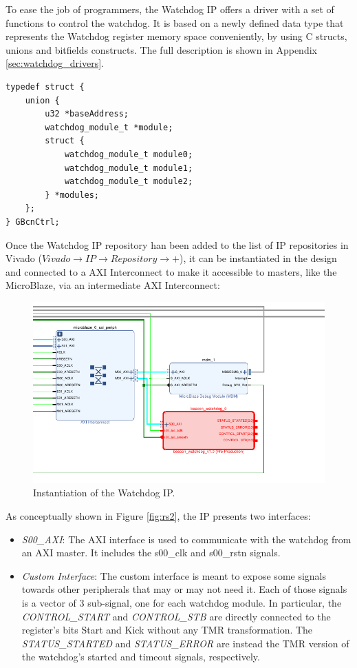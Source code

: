 To ease the job of programmers, the Watchdog IP offers a driver with a set of functions to control the watchdog. It is based on a newly defined data type that represents the Watchdog register memory space conveniently, by using C structs, unions and bitfields constructs. The full description is shown in Appendix \ref{sec:watchdog_drivers}.

\begin{lstlisting}[style=C]
typedef struct {
	union {
		u32 *baseAddress;
		watchdog_module_t *module;
		struct {
			watchdog_module_t module0;
			watchdog_module_t module1;
			watchdog_module_t module2;
		} *modules;
	};
} GBcnCtrl;
\end{lstlisting}

Once the Watchdog IP repository han been added to the list of IP repositories in Vivado ($Vivado \rightarrow IP \rightarrow Repository \rightarrow +$), it can be instantiated in the design and connected to a AXI Interconnect to make it accessible to masters, like the MicroBlaze, via an intermediate AXI Interconnect:

\begin{figure}[H]
\centering
\includegraphics[width=0.9\linewidth]{images/chapter4/wd_ip_inst_cropped2.pdf}
\caption{Instantiation of the Watchdog IP.}
\label{fig:wd_ip_inst}
\end{figure}

As conceptually shown in Figure \ref{fig:rs2}, the IP presents two interfaces:
\begin{itemize}
    \item \textit{S00\_AXI}: The AXI interface is used to communicate with the watchdog from an AXI master. It includes the s00\_clk and s00\_rstn signals.
    \item \textit{Custom Interface}: The custom interface is meant to expose some signals towards other peripherals that may or may not need it. Each of those signals is a vector of 3 sub-signal, one for each watchdog module. In particular, the \textit{CONTROL\_START} and \textit{CONTROL\_STB} are directly connected to the register's bits Start and Kick without any TMR transformation. The \textit{STATUS\_STARTED} and \textit{STATUS\_ERROR} are instead the TMR version of the watchdog's started and timeout signals, respectively.
\end{itemize}

